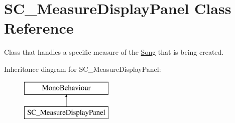 \hypertarget{class_s_c___measure_display_panel}{}\section{S\+C\+\_\+\+Measure\+Display\+Panel Class Reference}
\label{class_s_c___measure_display_panel}


Class that handles a specific measure of the \hyperlink{class_song}{Song} that is being created.  


Inheritance diagram for S\+C\+\_\+\+Measure\+Display\+Panel\+:\begin{figure}[H]
\begin{center}
\leavevmode
\includegraphics[height=2.000000cm]{class_s_c___measure_display_panel}
\end{center}
\end{figure}
